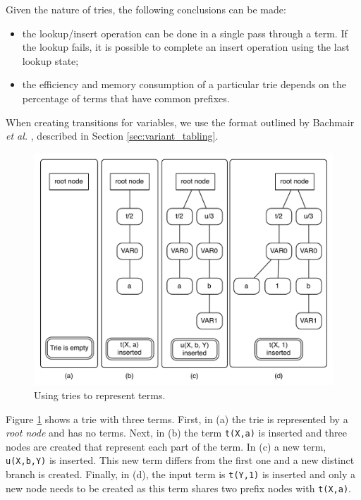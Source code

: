 Given the nature of tries, the following conclusions can be made:

\begin{itemize}
  \item the lookup/insert operation can be done in a single pass through a term. If the lookup fails, it is possible
  to complete an insert operation using the last lookup state;
  \item the efficiency and memory consumption of a
  particular trie depends on the percentage of terms that have common prefixes.
\end{itemize}

When creating transitions for variables, we use the format outlined by Bachmair \textit{et al.} \cite{Bachmair-93},
described in Section \ref{sec:variant_tabling}.

\begin{figure}[ht]
  \centering
    \includegraphics[scale=0.6]{tries.pdf}
  \caption{Using tries to represent terms.}
  \label{fig:tries_use}
\end{figure}

Figure \ref{fig:tries_use} shows a trie with three terms. First, in (a) the trie is represented by a \textit{root node} and has
no terms. Next, in (b) the term \texttt{t(X,a)} is inserted and three nodes are created that represent each part of the term.
In (c) a new term, \texttt{u(X,b,Y)} is inserted. This new term differs from the first one and a new distinct branch is created.
Finally, in (d), the input term is \texttt{t(Y,1)} is inserted and only a new node needs to be created as this term shares
two prefix nodes with \texttt{t(X,a)}.

